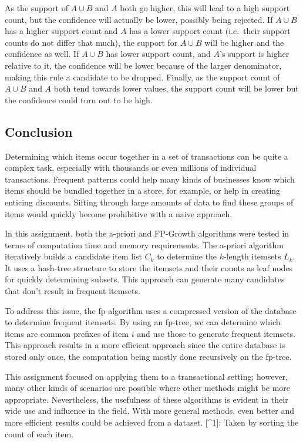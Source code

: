 \documentclass[
  paper=a4,
,captions=tableheading
]{scrartcl}
\begin{document}
As the support of \(A\cup B\) and \(A\) both go higher, this will lead
to a high support count, but the confidence will actually be lower,
possibly being rejected. If \(A\cup B\) has a higher support count and
\(A\) has a lower support count (i.e.~their support counts do not differ
that much), the support for \(A\cup B\) will be higher and the
confidence as well. If \(A\cup B\) has lower support count, and \(A\)'s
support is higher relative to it, the confidence will be lower because
of the larger denominator, making this rule a candidate to be dropped.
Finally, as the support count of \(A\cup B\) and \(A\) both tend towards
lower values, the support count will be lower but the confidence could
turn out to be high.

\hypertarget{conclusion}{%
\subsection{Conclusion}\label{conclusion}}

Determining which items occur together in a set of transactions can be
quite a complex task, especially with thousands or even millions of
individual transactions. Frequent patterns could help many kinds of
businesses know which items should be bundled together in a store, for
example, or help in creating enticing discounts. Sifting through large
amounts of data to find these groups of items would quickly become
prohibitive with a naive approach.

In this assignment, both the a-priori and FP-Growth algorithms were
tested in terms of computation time and memory requirements. The
a-priori algorithm iteratively builds a candidate item list \(C_{k}\) to
determine the \(k\)-length itemsets \(L_{k}\). It uses a hash-tree
structure to store the itemsets and their counts as leaf nodes for
quickly determining subsets. This approach can generate many candidates
that don't result in frequent itemsets.

To address this issue, the fp-algorithm uses a compressed version of the
database to determine frequent itemsets. By using an fp-tree, we can
determine which items are common prefixes of item \(i\) and use those to
generate frequent itemsets. This approach results in a more efficient
approach since the entire database is stored only once, the computation
being mostly done recursively on the fp-tree.

This assignment focused on applying them to a transactional setting;
however, many other kinds of scenarios are possible where other methods
might be more appropriate. Nevertheless, the usefulness of these
algorithms is evident in their wide use and influence in the field. With
more general methods, even better and more efficient results could be
achieved from a dataset. {[}\^{}1{]}: Taken by sorting the count of each
item.
\end{document}
